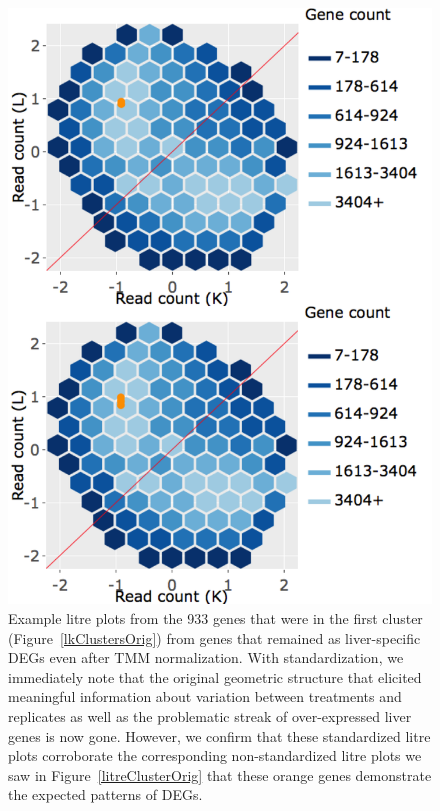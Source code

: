 \documentclass[11pt,a4paper,oldfontcommands,openany]{memoir}
\numberwithin{equation}{section} %
\begin{document}
\null
\begin{figure}[t!]
\begin{framed}
\centerline{\includegraphics[width=0.7\columnwidth]{MakeFigures/Dashboards/litreClusterOrig-St/litreClusterOrig-St.jpg}}
\end{framed}
\caption{Example litre plots from the 933 genes that were in the first cluster (Figure~\ref{lkClustersOrig}) from genes that remained as liver-specific DEGs even after TMM normalization. With standardization, we immediately note that the original geometric structure that elicited meaningful information about variation between treatments and replicates as well as the problematic streak of over-expressed liver genes is now gone. However, we confirm that these standardized litre plots corroborate the corresponding non-standardized litre plots we saw in Figure~\ref{litreClusterOrig} that these orange genes demonstrate the expected patterns of DEGs.
\label{litreClusterOrig-St}}
\end{figure}
\end{document}
